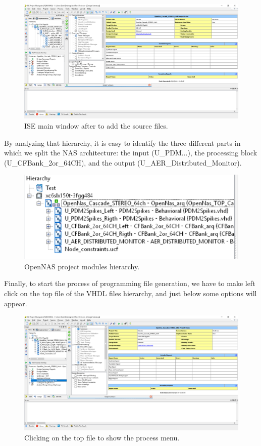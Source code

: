 \begin{figure}[H]
\centering
\includegraphics[width=1\textwidth]{images/Img38_ProjectReady.PNG}
\caption{\label{fig:ISE_sources_added}ISE main window after to add the source files.}
\end{figure}

By analyzing that hierarchy, it is easy to identify the three different parts in which we split the NAS architecture: the input (U\_PDM...), the processing block (U\_CFBank\_2or\_64CH), and the output (U\_AER\_Distributed\_Monitor).

\begin{figure}[H]
\centering
\includegraphics[width=1\textwidth]{images/Img39_Hierarchy.PNG}
\caption{\label{fig:ISE_project_hierarchy}OpenNAS project modules hierarchy.}
\end{figure}

Finally, to start the process of programming file generation, we have to make left click on the top file of the VHDL files hierarchy, and just below some options will appear.

\begin{figure}[H]
\centering
\includegraphics[width=1\textwidth]{images/Img40_GeneratingProgFile.PNG}
\caption{\label{fig:ISE_project_process}Clicking on the top file to show the process menu.}
\end{figure}

